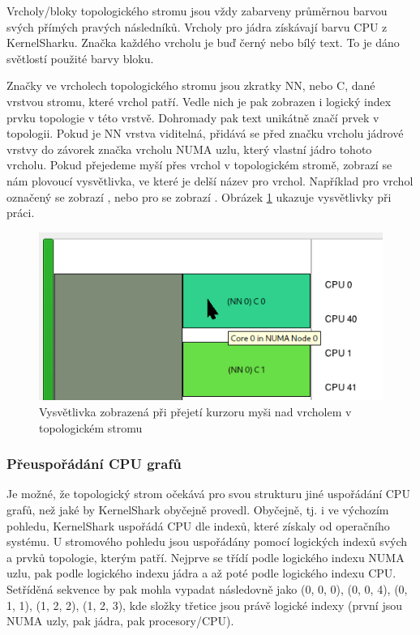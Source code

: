 Vrcholy/bloky topologického stromu jsou vždy zabarveny průměrnou barvou svých přímých pravých následníků. Vrcholy pro jádra získávají barvu CPU z KernelSharku. Značka každého vrcholu je buď černý nebo bílý text. To je dáno světlostí použité barvy bloku.

Značky ve vrcholech topologického stromu jsou zkratky NN, nebo C, dané vrstvou stromu, které vrchol patří. Vedle nich je pak zobrazen i logický index prvku topologie v této vrstvě. Dohromady pak text unikátně značí prvek v topologii. Pokud je NN vrstva viditelná, přidává se před značku vrcholu jádrové vrstvy do závorek značka vrcholu NUMA uzlu, který vlastní jádro tohoto vrcholu. Pokud přejedeme myší přes vrchol v topologickém stromě, zobrazí se nám plovoucí vysvětlivka, ve které je delší název pro vrchol. Například pro vrchol označený  se zobrazí , nebo pro  se zobrazí . Obrázek \ref{numatv-8} ukazuje vysvětlivky při práci.

\begin{figure}[p]\centering
    \includegraphics[width=140mm]{img/NUMATV/numatv-8}
    \caption{Vysvětlivka zobrazená při přejetí kurzoru myši nad vrcholem v topologickém stromu}
    \label{numatv-8}
\end{figure}

\subsubsection{Přeuspořádání CPU grafů}

Je možné, že topologický strom očekává pro svou strukturu jiné uspořádání CPU grafů, než jaké by KernelShark obyčejně provedl. Obyčejně, tj. i ve výchozím pohledu, KernelShark uspořádá CPU dle indexů, které získaly od operačního systému. U stromového pohledu jsou uspořádány pomocí logických indexů svých a prvků topologie, kterým patří. Nejprve se třídí podle logického indexu NUMA uzlu, pak podle logického indexu jádra a až poté podle logického indexu CPU. Setříděná sekvence by pak mohla vypadat následovně jako (0, 0, 0), (0, 0, 4), (0, 1, 1), (1, 2, 2), (1, 2, 3), kde složky třetice jsou právě logické indexy (první jsou NUMA uzly, pak jádra, pak procesory/CPU).

